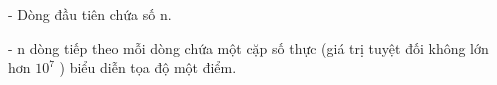 - Dòng đầu tiên chứa số n.  

   - n dòng tiếp theo mỗi dòng chứa một cặp số thực (giá trị tuyệt đối không lớn hơn $10^{7}$   ) biểu diễn tọa độ một điểm.